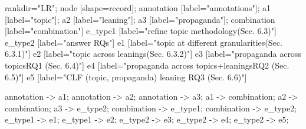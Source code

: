 


 {
    rankdir="LR";
    node [shape=record];
    annotation [label="annotations"];
    a1 [label="topic"];
    a2 [label="leaning"];
    a3 [label="propaganda"];
    combination [label="combination"]
    e_type1 [label="refine topic methodology\gvnewline (Sec. 6.3)"]
    e_type2 [label="answer RQs"]
    e1 [label="topic at different granularities\gvnewline (Sec. 6.3.1)"]
    e2 [label="topic across leanings\gvnewline (Sec. 6.3.2)"]
    e3 [label="propaganda across topics\gvnewline RQ1 (Sec. 6.4)"]
    e4 [label="propaganda across topics+leanings\gvnewline RQ2 (Sec. 6.5)"]
    e5 [label="CLF (topic, propaganda)  leaning \gvnewline RQ3 (Sec. 6.6)"]
    
    annotation -> a1;
    annotation -> a2;
    annotation -> a3;
    a1 -> combination;
    a2 -> combination;
    a3 -> e_type2;
    combination -> e_type1;
    combination -> e_type2;
    e_type1 -> e1;
    e_type1 -> e2;
    e_type2 -> e3;
    e_type2 -> e4;
    e_type2 -> e5;
}
